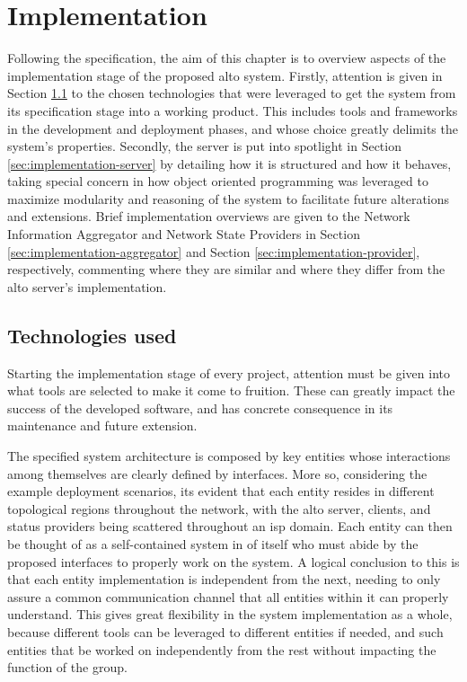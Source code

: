 \chapter{Implementation}

    Following the specification, the aim of this chapter is to overview aspects of the implementation stage of the proposed \gls{alto} system.
    Firstly, attention is given in Section \ref{sec:implementation-technologies} to the chosen technologies that were leveraged to get the system from its specification stage into a working product.
    This includes tools and frameworks in the development and deployment phases, and whose choice greatly delimits the system's properties.
    Secondly, the server is put into spotlight in Section \ref{sec:implementation-server} by detailing how it is structured and how it behaves, taking special concern in how object oriented programming was leveraged to maximize modularity and reasoning of the system to facilitate future alterations and extensions.
    Brief implementation overviews are given to the Network Information Aggregator and Network State Providers in Section \ref{sec:implementation-aggregator} and Section \ref{sec:implementation-provider}, respectively, commenting where they are similar and where they differ from the \gls{alto} server's implementation.

\section{Technologies used}

\label{sec:implementation-technologies}

    Starting the implementation stage of every project, attention must be given into what tools are selected to make it come to fruition.
    These can greatly impact the success of the developed software, and has concrete consequence in its maintenance and future extension.

    The specified system architecture is composed by key entities whose interactions among themselves are clearly defined by interfaces.
    More so, considering the example deployment scenarios, its evident that each entity resides in different topological regions throughout the network, with the \gls{alto} server, clients, and status providers being scattered throughout an \gls{isp} domain.
    Each entity can then be thought of as a self-contained system in of itself who must abide by the proposed interfaces to properly work on the system.
    A logical conclusion to this is that each entity implementation is independent from the next, needing to only assure a common communication channel that all entities within it can properly understand.
    This gives great flexibility in the system implementation as a whole, because different tools can be leveraged to different entities if needed, and such entities that be worked on independently from the rest without impacting the function of the group.

